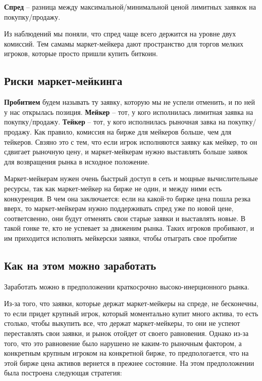  \textbf{Спред} -- разница между максимальной/минимальной ценой лимитных заявкок на покупку/продажу.

Из наблюдений мы поняли, что спред чаще всего держится на уровне двух комиссий. Тем самамы маркет-мейкера дают пространство для торгов мелких игроков, которые просто пришли купить биткоин.

\subsection{Риски маркет-мейкинга}

 \textbf{Пробитием} будем называть ту заявку, которую мы не успели отменить, и по ней у нас открылась позиция.
 \textbf{Мейкер} -- тот, у кого исполнилась лимитная заявка на покупку/продажу.
 \textbf{Тейкер} -- тот, у кого исполнилась рыночная завка на покупку/продажу.
\remark Как правило, комиссия на бирже для мейкеров больше, чем для тейкеров. Свзяно это с тем, что если игрок исполняются заявку как мейкер, то  он сдвигает рыночную цену, и маркет-мейкерам нужно выставлять больше заявок для возвращения рынка в исходное положение.

Маркет-мейкерам нужен очень быстрый доступ в сеть и мощные вычислительные ресурсы, так как маркет-мейкер на бирже не один, и между ними есть конкуренция. В чем она заключается: если на какой-то бирже цена пошла резка вверх, то маркет-мейкерам нужно поддерживать спред уже по новой цене, соответсвенно, они будут отменять свои старые заявки и выставлять новые. В такой гонке те, кто не успевает за движеним рынка. Таких игроков пробивают, и им приходится исполнять мейкерски заявки, чтобы отыграть свое пробитие

\subsection{Как на этом можно заработать}

Заработать можно в предположении краткосрочно высоко-инерционного рынка.

Из-за того, что заявки, которые держат маркет-мейкеры на спреде, не бесконечны, то если придет крупный игрок, который моментально купит много актива, то есть столько, чтобы выкупить все, что держат маркет-мейкеры, то они не успеют переставлять свои заявки, и рынок отойдет от своего равновения. Однако из-за того, что это равновение было нарушено не каким-то рыночным фактором, а конкретным крупным игроком на конкретной бирже, то предпологается, что на этой бирже цена активов вернется в прежнее состояние. На этом предположении была построена следующая стратегия:

